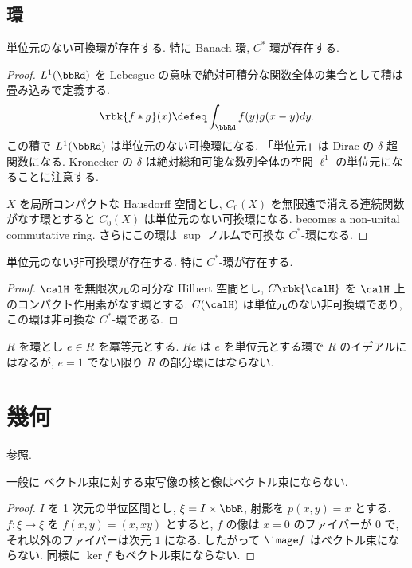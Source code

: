 \documentclass[openany, a4paper, oneside]{jsbook}
\begin{document}
\section{環}

\begin{ex}[単位元のない可換環]
単位元のない可換環が存在する.
特に Banach 環, $C^*$-環が存在する.
\end{ex}
\begin{proof}
$L^1(\bbRd)$ を Lebesgue の意味で絶対可積分な関数全体の集合として積は畳み込みで定義する.
\begin{align}
 \rbk{f * g} (x)
 \defeq
 \int_{\bbRd} f(y) g(x - y) dy.
\end{align}
この積で $L^1(\bbRd)$ は単位元のない可換環になる.
「単位元」は Dirac の $\delta$ 超関数になる.
Kronecker の $\delta$ は絶対総和可能な数列全体の空間 $\ell^{1}$ の単位元になることに注意する.

$X$ を局所コンパクトな Hausdorff 空間とし, $C_0(X)$ を無限遠で消える連続関数がなす環とすると
$C_0(X)$ は単位元のない可換環になる. becomes a non-unital commutative ring.
さらにこの環は $\sup$ ノルムで可換な $C^*$-環になる.
\end{proof}

\begin{ex}[単位元のない非可換環]
単位元のない非可換環が存在する.
特に $C^*$-環が存在する.
\end{ex}
\begin{proof}
$\calH$ を無限次元の可分な Hilbert 空間とし, $C \rbk{\calH}$ を $\calH$ 上のコンパクト作用素がなす環とする.
$C (\calH)$ は単位元のない非可換環であり,
この環は非可換な $C^*$-環である.
\end{proof}

\begin{ex}[冪等元が生成するは元の環の部分環にならない]
$R$ を環とし $e \in R$ を冪等元とする.
$Re$ は $e$ を単位元とする環で $R$ のイデアルにはなるが, $e = 1$ でない限り $R$ の部分環にはならない.
\end{ex}
\chapter{幾何}

\begin{ex}
\cite{CalabiRosenlicht1} 参照.
\end{ex}

\begin{ex}
一般に ベクトル束に対する束写像の核と像はベクトル束にならない.
\end{ex}
\begin{proof}
$I$ を 1 次元の単位区間とし, $\xi = I \times \bbR$, 射影を $p(x,y) = x$ とする.
$f \colon \xi \to \xi$ を $f(x,y) = (x, xy)$ とすると,
$f$ の像は $x = 0$ のファイバーが $0$ で, それ以外のファイバーは次元 $1$ になる.
したがって $\image f$ はベクトル束にならない.
同様に $\ker f$ もベクトル束にならない.
\end{proof}
\end{document}
